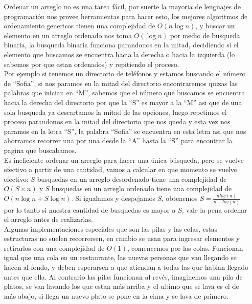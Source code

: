 Ordenar un arreglo no es una tarea fácil, por suerte la mayoria de lenguajes de programación nos provee herramientas para hacer esto, los mejores algoritmos de ordenamiento genericos tienen una complejidad de $O(n\log{}n)$, y buscar un elemento en un arreglo ordenado nos toma $O(\log{}n)$ por medio de busqueda binaria, la busqueda binaria funciona parandonos en la mitad, decidiendo si el elemento que buscamos se encuentra hacia la derecha o hacia la izquierda (lo sabemos por que estan ordenados) y repitiendo el proceso.
\\Por ejemplo si tenemos un directorio de teléfonos y estamos buscando el número de ``Sofia'', si nos paramos en la mitad del directorio encontraremos quizas las palabras que inician en ``M'', sabemos que el número que buscamos se encuentra hacia la derecha del directorio por que la ``S'' es mayor a la ``M'' asi que de una sola busqueda ya descartamos la mitad de las opciones, luego repetimos el proceso parandonos en la mitad del directorio que nos queda y esta vez nos paramos en la letra ``S'', la palabra ``Sofia'' se encuentra en esta letra asi que nos ahorramos recorrer una por una desde la ``A'' hasta la ``S'' para encontrar la pagina que buscabamos.
\\Es ineficiente ordenar un arreglo para hacer una única búsqueda, pero se vuelve efectivo a partir de una cantidad, vamos a calcular en que momento se vuelve efectivo: $S$ busquedas en un arreglo desordenado tiene una complejidad de $O(S\times{}n)$ y $S$ busquedas en un arreglo ordenado tiene una complejidad de $O(n\log{}n + S\log{}n)$. Si igualamos y despejamos $S$, obtenemos $S =\frac{nlog(n)}{n-log(n)}$ por lo tanto si nuestra cantidad de busquedas es mayor a $S$, vale la pena ordenar el arreglo antes de realizarlas.
\\Algunas implementaciones especiales que son las pilas y las colas, estas estructuras no suelen recorrersen, en cambio se usan para ingresar elementos y retirarlos con una complejidad de $O(1)$, comencemos por las colas. Funcionan igual que una cola en un restaurante, las nuevas personas que van llegando se hacen al fondo, y deben esperarsen a que atiendan a todas las que habian llegado antes que ella. Al contrario las pilas funcionan al revés, imaginemos una pila de platos, se van lavando los que estan más arriba y el ultimo que se lava es el de más abajo, si llega un nuevo plato se pone en la cima y se lava de primero.
\\
